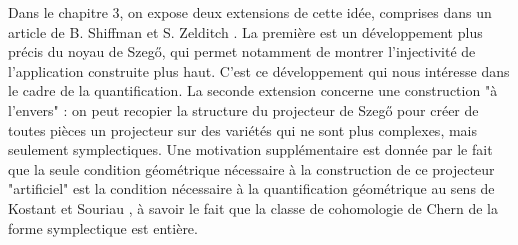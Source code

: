 Dans le chapitre 3, on expose deux extensions de cette idée, comprises dans un article de B. Shiffman et S. Zelditch \cite{Shiffman2002}. La première est un développement plus précis du noyau de Szeg\H{o}, qui permet notamment de montrer l'injectivité de l'application construite plus haut. C'est ce développement qui nous intéresse dans le cadre de la quantification. La seconde extension concerne une construction "à l'envers" : on peut recopier la structure du projecteur de Szeg\H{o} pour créer de toutes pièces un projecteur sur des variétés qui ne sont plus complexes, mais seulement symplectiques. Une motivation supplémentaire est donnée par le fait que la seule condition géométrique nécessaire à la construction de ce projecteur "artificiel" est la condition nécessaire à la quantification géométrique au sens de Kostant et Souriau \cite{Woodhouse1997geometric}, à savoir le fait que la classe de cohomologie de Chern de la forme symplectique est entière.
